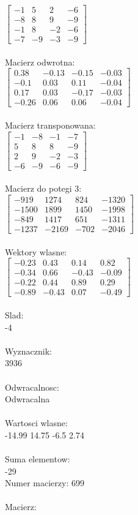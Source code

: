 \documentclass[a4paper,12pt]{article}
\begin{document}
$\begin{bmatrix} -1&5&2&-6\\-8&8&9&-9\\-1&8&-2&-6\\-7&-9&-3&-9 \end{bmatrix}$
\\
\\
Macierz odwrotna:\\

$\begin{bmatrix} 0.38&-0.13&-0.15&-0.03\\-0.1&0.03&0.11&-0.04\\0.17&0.03&-0.17&-0.03\\-0.26&0.06&0.06&-0.04 \end{bmatrix}$
\\
\\
Macierz transponowana:\\

$\begin{bmatrix} -1&-8&-1&-7\\5&8&8&-9\\2&9&-2&-3\\-6&-9&-6&-9 \end{bmatrix}$
\\
\\
Macierz do potegi 3:\\

$\begin{bmatrix} -919&1274&824&-1320\\-1500&1899&1450&-1998\\-849&1417&651&-1311\\-1237&-2169&-702&-2046 \end{bmatrix}$
\\
\\
Wektory wlasne:\\

$\begin{bmatrix} -0.23&0.43&0.14&0.82\\-0.34&0.66&-0.43&-0.09\\-0.22&0.44&0.89&0.29\\-0.89&-0.43&0.07&-0.49 \end{bmatrix}$
\\
\\
Slad:\\
-4
\\
\\
Wyznacznik:\\
3936
\\
\\
Odwracalnosc:\\
Odwracalna
\\
\\
Wartosci wlasne:\\
-14.99 14.75 -6.5 2.74
\\
\\
Suma elementow:\\
-29
\\
\newpage
Numer macierzy:
699
\\
\\
Macierz:\\
\end{document}
